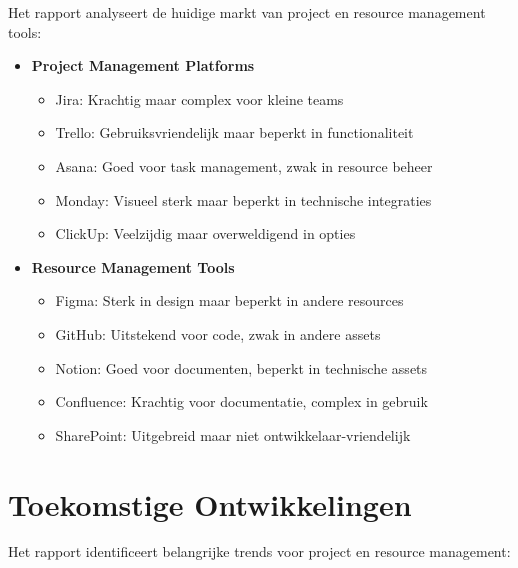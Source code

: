 Het \textcite{GitLab2023} rapport analyseert de huidige markt van project en resource management tools:

\begin{itemize}
    \item \textbf{Project Management Platforms}
    \begin{itemize}
        \item Jira: Krachtig maar complex voor kleine teams
        \item Trello: Gebruiksvriendelijk maar beperkt in functionaliteit
        \item Asana: Goed voor task management, zwak in resource beheer
        \item Monday: Visueel sterk maar beperkt in technische integraties
        \item ClickUp: Veelzijdig maar overweldigend in opties
    \end{itemize}
    
    \item \textbf{Resource Management Tools}
    \begin{itemize}
        \item Figma: Sterk in design maar beperkt in andere resources
        \item GitHub: Uitstekend voor code, zwak in andere assets
        \item Notion: Goed voor documenten, beperkt in technische assets
        \item Confluence: Krachtig voor documentatie, complex in gebruik
        \item SharePoint: Uitgebreid maar niet ontwikkelaar-vriendelijk
    \end{itemize}
\end{itemize}

\section{Toekomstige Ontwikkelingen}
\label{sec:toekomst}

Het \textcite{StateOfAgile2023} rapport identificeert belangrijke trends voor project en resource management:

